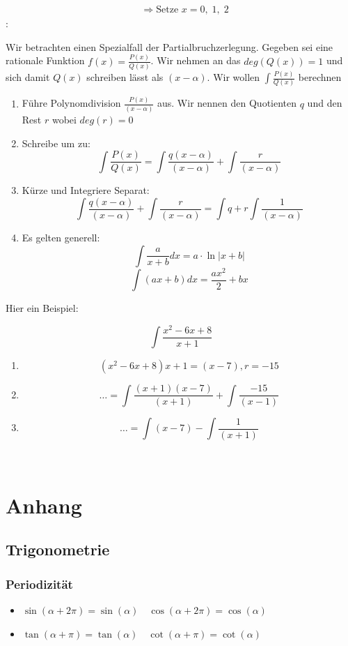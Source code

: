 \documentclass[7pt,landscape, margin = 0.1mm]{article}
\newcommand{\KRZ}[2]{\vspace{1mm} \hline \vspace{1mm} \color{chaptercolor}{RC #1}:\color{black} \   \hspace{0.2cm}\vspace{1mm}   {\begin{minipage}{20em}
#2 \end{minipage}} \vspace{1mm}  \hline \vspace{1mm}  \\}
\begin{document}
\begin{multicols}{4}
\begin{flushleft}
{\begin{align*}
  &\Rightarrow \text{Setze } x = 0,\;1,\;2
\end{align*}}
\KRZ{Rationale Funktionen Integrieren}{
Wir betrachten einen Spezialfall der Partialbruchzerlegung.
Gegeben sei eine rationale Funktion $f(x)=\frac{P(x)}{Q(x)}$. Wir nehmen an das $deg(Q(x))=1$ und sich damit $Q(x)$ schreiben lässt als $(x - \alpha)$. Wir wollen $\int \frac{P(x)}{Q(x)}$ berechnen
\begin{enumerate}
\item Führe Polynomdivision $\frac{P(x)}{(x- \alpha)}$ aus. Wir nennen den Quotienten $q$ und den Rest $r$ wobei $deg(r)=0$
\item Schreibe um zu: $$\int\frac{P(x)}{Q(x)} = \int \frac{q (x-\alpha)}{(x-\alpha)}+ \int \frac{r}{(x-\alpha)}$$
\item Kürze und Integriere Separat: $$ \int \frac{q (x-\alpha)}{(x-\alpha)}+ \int \frac{r}{(x-\alpha)}= \int q  + r \int \frac{1}{(x-\alpha)}$$
 \item Es gelten generell: $$\int \frac{a}{x+b} dx = a \cdot \ln |x+b| $$ $$  \int (ax + b) dx = \frac{ax^2}{2	}+bx$$
\end{enumerate}
Hier ein Beispiel:

$$\int \frac{x^2-6x+8}{x+1}$$
\begin{enumerate}
\item $$(x^2-6x+8){x+1} = (x-7), r = -15$$
\item $$ \ldots = \int \frac{(x+1)(x-7)}{(x+1)} + \int \frac{-15}{(x-1)}$$
\item $$\ldots= \int (x-7) - \int \frac{1}{(x+1)}$$
\end{enumerate}
}


\section{Anhang}
\subsection{Trigonometrie}
\vspace{1mm} \hline \vspace{3 mm}
\subsubsection{Periodizität}
\begin{itemize}
 \item $\sin(\alpha + 2 \pi) = \sin(\alpha) \quad \cos(\alpha + 2 \pi) = \cos(\alpha)$
 \item $\tan(\alpha + \pi) = \tan(\alpha) \quad \cot(\alpha + \pi) = \cot(\alpha)$


\end{itemize}
\end{flushleft}
\end{multicols}
\end{document}
